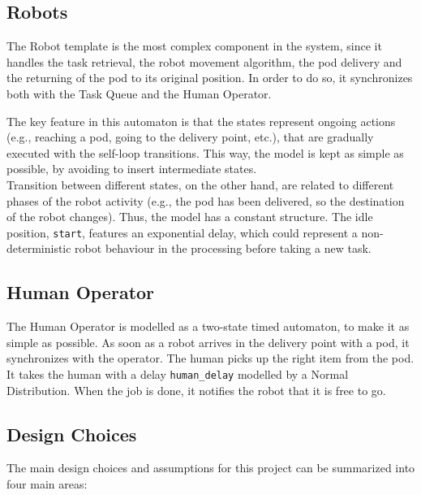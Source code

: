 \subsection{Robots}
The Robot template is the most complex component in the system, since it handles the task retrieval, the robot movement algorithm, the pod delivery and the returning of the pod to its original position.
In order to do so, it synchronizes both with the Task Queue and the Human Operator. 

The key feature in this automaton is that the states represent ongoing actions (e.g., reaching a pod, going to the delivery point, etc.), that are gradually executed with the self-loop transitions. This way, the model is kept as simple as possible, by avoiding to insert intermediate states. \\
Transition between different states, on the other hand, are related to different phases of the robot activity (e.g., the pod has been delivered, so the destination of the robot changes). Thus, the model has a constant structure. 
The idle position, \texttt{start}, features an exponential delay, which could represent a non-deterministic robot behaviour in the processing before taking a new task.

\subsection{Human Operator}	
The Human Operator is modelled as a two-state timed automaton, to make it as simple as possible. As soon as a robot arrives in the delivery point with a pod, it synchronizes with the operator. The human picks up the right item from the pod. It takes the human with a delay \texttt{human\_delay} modelled by a Normal Distribution. When the job is done, it notifies the robot that it is free to go. 

\subsection{Design Choices}
The main design choices and assumptions for this project can be summarized into four main areas:

